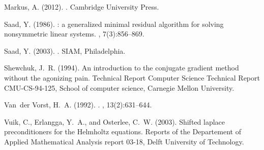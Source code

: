 \documentclass[10pt]{article}
\begin{document}
\begin{thebibliography}{}
Markus, A. (2012).
.
\newblock Cambridge University Press.

Saad, Y. (1986).
: a generalized minimal residual algorithm for solving
  nonsymmetric linear systems.
,
  7(3):856--869.

Saad, Y. (2003).
.
\newblock SIAM, Philadelphia.

Shewchuk, J.~R. (1994).
\newblock An introduction to the conjugate gradient method without the
  agonizing pain.
\newblock Technical Report Computer Science Technical Report CMU-CS-94-125,
  School of computer science, Carnegie Mellon University.

Van~der Vorst, H.~A. (1992).
.
,
  13(2):631--644.

Vuik, C., Erlangga, Y.~A., and Osterlee, C.~W. (2003).
\newblock Shifted laplace preconditioners for the {H}elmholtz equations.
\newblock Reports of the Departement of Applied Mathematical Analysis report
  03-18, Delft University of Technology.

\end{thebibliography}
\end{document}
